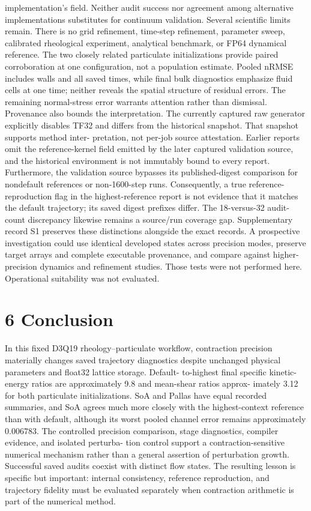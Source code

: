 \documentclass[11pt]{article}
\begin{document}
implementation’s field. Neither audit success nor agreement among alternative implementations
substitutes for continuum validation.
Several scientific limits remain. There is no grid refinement, time-step refinement, parameter
sweep, calibrated rheological experiment, analytical benchmark, or FP64 dynamical reference. The
two closely related particulate initializations provide paired corroboration at one configuration,
not a population estimate. Pooled nRMSE includes walls and all saved times, while final bulk
diagnostics emphasize fluid cells at one time; neither reveals the spatial structure of residual errors.
The remaining normal-stress error warrants attention rather than dismissal.
Provenance also bounds the interpretation. The currently captured raw generator explicitly
disables TF32 and differs from the historical snapshot. That snapshot supports method inter-
pretation, not per-job source attestation. Earlier reports omit the reference-kernel field emitted
by the later captured validation source, and the historical environment is not immutably bound
to every report. Furthermore, the validation source bypasses its published-digest comparison for
nondefault references or non-1600-step runs. Consequently, a true reference-reproduction flag in
the highest-reference report is not evidence that it matches the default trajectory; its saved digest
prefixes differ. The 18-versus-32 audit-count discrepancy likewise remains a source/run coverage
gap. Supplementary record S1 preserves these distinctions alongside the exact records.
A prospective investigation could use identical developed states across precision modes, preserve
target arrays and complete executable provenance, and compare against higher-precision dynamics
and refinement studies. Those tests were not performed here. Operational suitability was not
evaluated.

\section*{6 Conclusion}

In this fixed D3Q19 rheology–particulate workflow, contraction precision materially changes saved
trajectory diagnostics despite unchanged physical parameters and float32 lattice storage. Default-
to-highest final specific kinetic-energy ratios are approximately 9.8 and mean-shear ratios approx-
imately 3.12 for both particulate initializations. SoA and Pallas have equal recorded summaries,
and SoA agrees much more closely with the highest-context reference than with default, although
its worst pooled channel error remains approximately 0.006783.
The controlled precision comparison, stage diagnostics, compiler evidence, and isolated perturba-
tion control support a contraction-sensitive numerical mechanism rather than a general assertion of
perturbation growth. Successful saved audits coexist with distinct flow states. The resulting lesson
is specific but important: internal consistency, reference reproduction, and trajectory fidelity must
be evaluated separately when contraction arithmetic is part of the numerical method.
\end{document}
